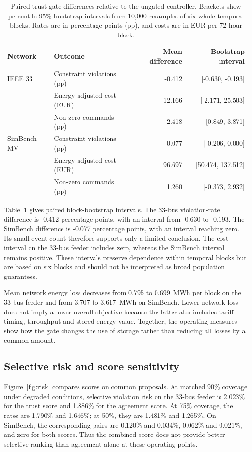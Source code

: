 \documentclass[11pt,a4paper]{article}
\begin{document}
\begin{table}[t]
\centering\small
\caption{Paired trust-gate differences relative to the ungated controller. Brackets show percentile 95\% bootstrap intervals from 10,000 resamples of six whole temporal blocks. Rates are in percentage points (pp), and costs are in EUR per 72-hour block.}\label{tab:paired}
\begin{tabular}{llrr}
\toprule
Network & Outcome & Mean difference & Bootstrap interval\\\midrule
IEEE 33 & Constraint violations (pp) & -0.412 & [-0.630, -0.193] \\
 & Energy-adjusted cost (EUR) & 12.166 & [-2.171, 25.503] \\
 & Non-zero commands (pp) & 2.418 & [0.849, 3.871] \\
\addlinespace
SimBench MV & Constraint violations (pp) & -0.077 & [-0.206, 0.000] \\
 & Energy-adjusted cost (EUR) & 96.697 & [50.474, 137.512] \\
 & Non-zero commands (pp) & 1.260 & [-0.373, 2.932] \\
\bottomrule\end{tabular}\end{table}

Table~\ref{tab:paired} gives paired block-bootstrap intervals. The 33-bus violation-rate difference is -0.412 percentage points, with an interval from -0.630 to -0.193. The SimBench difference is -0.077 percentage points, with an interval reaching zero. Its small event count therefore supports only a limited conclusion. The cost interval on the 33-bus feeder includes zero, whereas the SimBench interval remains positive. These intervals preserve dependence within temporal blocks but are based on six blocks and should not be interpreted as broad population guarantees.

Mean network energy loss decreases from 0.795 to 0.699~MWh per block on the 33-bus feeder and from 3.707 to 3.617~MWh on SimBench. Lower network loss does not imply a lower overall objective because the latter also includes tariff timing, throughput and stored-energy value. Together, the operating measures show how the gate changes the use of storage rather than reducing all losses by a common amount.

\subsection{Selective risk and score sensitivity}
Figure~\ref{fig:risk} compares scores on common proposals. At matched 90\% coverage under degraded conditions, selective violation risk on the 33-bus feeder is 2.023\% for the trust score and 1.886\% for the agreement score. At 75\% coverage, the rates are 1.790\% and 1.646\%; at 50\%, they are 1.481\% and 1.265\%. On SimBench, the corresponding pairs are 0.120\% and 0.034\%, 0.062\% and 0.021\%, and zero for both scores. Thus the combined score does not provide better selective ranking than agreement alone at these operating points.
\end{document}
